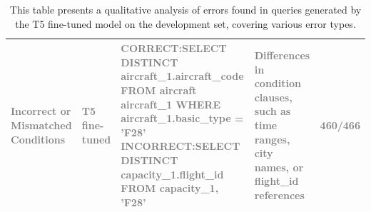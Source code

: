\documentclass{article}
\begin{document}
\begin{landscape}
\begin{table}
\begin{tabular}{p{2cm}p{2cm}p{10cm}p{6cm}p{2cm}}
    \midrule
    \textcolor{gray}{Incorrect or Mismatched Conditions} & \textcolor{gray}{T5 fine-tuned} & \textcolor{gray}{CORRECT:\newline SELECT DISTINCT aircraft\_1.aircraft\_code FROM aircraft aircraft\_1 WHERE aircraft\_1.basic\_type = 'F28' \newline \newline INCORRECT:\newline SELECT DISTINCT capacity\_1.flight\_id FROM capacity\_1, 'F28'} & \textcolor{gray}{Differences in condition clauses, such as time ranges, city names, or flight\_id references} & \textcolor{gray}{460/466} \\
    \bottomrule
  \end{tabular}
  \caption{This table presents a qualitative analysis of errors found in queries generated by the T5 fine-tuned model on the development set, covering various error types.}
  \label{tab:qualitative}
\end{table}
\end{landscape}
\end{document}
